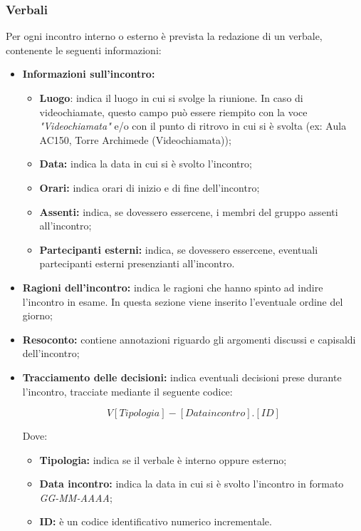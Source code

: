 \documentclass[../NormediProgetto.tex]{subfiles}
\begin{document}
\subsubsection{Verbali}

Per ogni incontro interno o esterno è prevista la redazione di un verbale, contenente le seguenti informazioni:
\begin{itemize}
    \item \textbf{Informazioni sull'incontro:}
    \begin{itemize}
        \item \textbf{Luogo}: indica il luogo in cui si svolge la riunione. In caso di videochiamate, questo campo può essere riempito con la voce \textit{"Videochiamata"} e/o con il punto di ritrovo in cui si è svolta (ex: Aula AC150, Torre Archimede (Videochiamata));
        \item \textbf{Data:} indica la data in cui si è svolto l'incontro;
        \item \textbf{Orari:} indica orari di inizio e di fine dell'incontro;
        \item \textbf{Assenti:} indica, se dovessero essercene, i membri del gruppo assenti all'incontro;
        \item \textbf{Partecipanti esterni:} indica, se dovessero essercene, eventuali partecipanti esterni presenzianti all'incontro.
    \end{itemize}
    
    \item \textbf{Ragioni dell'incontro:} indica le ragioni che hanno spinto ad indire l'incontro in esame. In questa sezione viene inserito l'eventuale ordine del giorno;
    
    \item \textbf{Resoconto:} contiene annotazioni riguardo gli argomenti discussi e capisaldi dell'incontro;
    
    \item \textbf{Tracciamento delle decisioni:} indica eventuali decisioni prese durante l'incontro, tracciate mediante il seguente codice:
    
        \[V[Tipologia]-[Data incontro].[ID]\]
    
    Dove:
    
    \begin{itemize}
        \item \textbf{Tipologia:} indica se il verbale è interno oppure esterno;
        \item \textbf{Data incontro:} indica la data in cui si è svolto l'incontro in formato \textit{GG-MM-AAAA};
        \item \textbf{ID:} è un codice identificativo numerico incrementale.
    \end{itemize}
    
\end{itemize}
\end{document}
